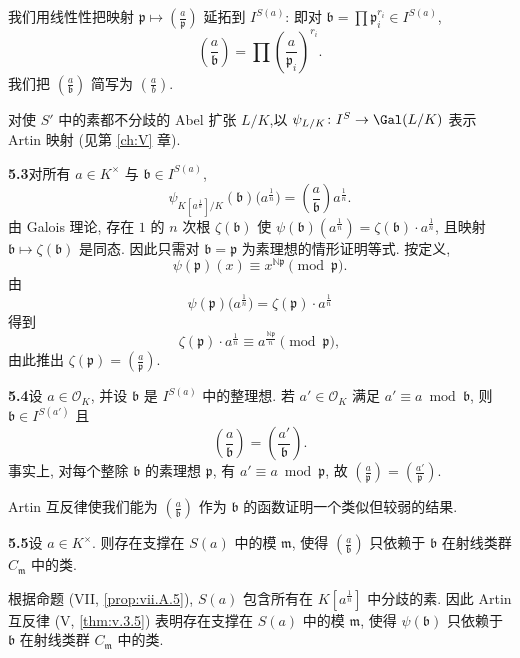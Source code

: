 我们用线性性把映射 $\mathfrak{p}\mapsto\left(\frac{a}{\mathfrak{p}}\right)$ 延拓到 $I^{S(a)}$: 即对 $\mathfrak{b}=\prod\mathfrak{p}_i^{r_i}\in I^{S(a)}$,
\[
\left(\frac{a}{\mathfrak{b}}\right)=\prod\left(\frac{a}{\mathfrak{p}_{i}}\right)^{r_{i}}.
\]
我们把 $\left(\frac{a}{\mathfrak{b}}\right)$ 简写为 $\left(\frac{a}{b}\right)$.

对使 $S'$ 中的素都不分歧的 Abel 扩张 $L/K$,以 $\psi_{L/K}\colon I^{S}\to\Gal(L/K)$ 表示 Artin 映射 (见第 \ref{ch:V} 章).

\noindent{}\hypertarget{item:viii.5.3}{}\textbf{5.3}\quad 对所有 $a\in K^{\times}$ 与 $\mathfrak{b}\in I^{S(a)}$,
\[
\psi_{K[a^{\frac{1}{n}}]/K}(\mathfrak{b})\big(a^{\frac{1}{n}}\big)=\left(\frac{a}{\mathfrak{b}}\right)a^{\frac{1}{n}}.
\]
由 Galois 理论, 存在 $1$ 的 $n$ 次根 $\zeta(\mathfrak{b})$ 使 $\psi(\mathfrak{b})(a^{\frac{1}{n}})=\zeta(\mathfrak{b})\cdot a^{\frac{1}{n}}$, 且映射 $\mathfrak{b}\mapsto\zeta(\mathfrak{b})$ 是同态. 因此只需对 $\mathfrak{b}=\mathfrak{p}$ 为素理想的情形证明等式. 按定义,
\[
\psi(\mathfrak{p})(x)\equiv x^{\mathbb{N}\mathfrak{p}}\pmod{\mathfrak{p}}.
\]
由
\[
\psi(\mathfrak{p})\big(a^{\frac{1}{n}}\big)=\zeta(\mathfrak{p})\cdot a^{\frac{1}{n}}
\]
得到
\[
\zeta(\mathfrak{p})\cdot a^{\frac{1}{n}}\equiv a^{\frac{\mathbb{N}\mathfrak{p}}{n}}\pmod{\mathfrak{p}},
\]
由此推出 $\zeta(\mathfrak{p})=\left(\frac{a}{\mathfrak{p}}\right)$.

\noindent\textbf{5.4}\quad 设 $a\in\mathcal{O}_{K}$, 并设 $\mathfrak{b}$ 是 $I^{S(a)}$ 中的整理想. 若 $a'\in\mathcal{O}_{K}$ 满足 $a'\equiv a \bmod \mathfrak{b}$, 则 $\mathfrak{b}\in I^{S(a')}$ 且
\[
\left(\frac{a}{\mathfrak{b}}\right)=\left(\frac{a'}{\mathfrak{b}}\right).
\]
事实上, 对每个整除 $\mathfrak{b}$ 的素理想 $\mathfrak{p}$, 有 $a'\equiv a \bmod \mathfrak{p}$, 故 $\left(\frac{a}{\mathfrak{p}}\right)=\left(\frac{a'}{\mathfrak{p}}\right)$.

Artin 互反律使我们能为 $\left(\frac{a}{\mathfrak{b}}\right)$ 作为 $\mathfrak{b}$ 的函数证明一个类似但较弱的结果.

\noindent{}\hypertarget{item:viii.5.5}{}\textbf{5.5}\quad 设 $a\in K^{\times}$. 则存在支撑在 $S(a)$ 中的模 $\mathfrak{m}$, 使得 $\left(\frac{a}{\mathfrak{b}}\right)$ 只依赖于 $\mathfrak{b}$ 在射线类群 $C_\mathfrak{m}$ 中的类.

根据命题 (VII, \ref{prop:vii.A.5}), $S(a)$ 包含所有在 $K[a^{\frac{1}{n}}]$ 中分歧的素. 因此 Artin 互反律 (V, \ref{thm:v.3.5}) 表明存在支撑在 $S(a)$ 中的模 $\mathfrak{m}$, 使得 $\psi(\mathfrak{b})$ 只依赖于 $\mathfrak{b}$ 在射线类群 $C_\mathfrak{m}$ 中的类.


